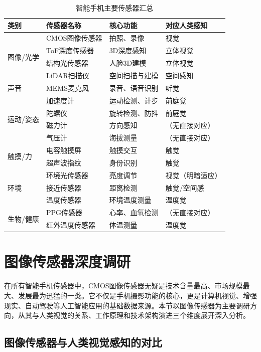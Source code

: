 \documentclass[12pt, a4paper]{ctexart}
\begin{document}
\begin{table}[H]
\centering
\caption{智能手机主要传感器汇总}
\label{tab:sensor_overview}
\small
\begin{tabular}{llll}
\toprule
\textbf{类别} & \textbf{传感器名称} & \textbf{核心功能} & \textbf{对应人类感知} \\
\midrule
\multirow{4}{*}{图像/光学} & CMOS图像传感器 & 拍照、录像 & 视觉 \\
 & ToF深度传感器 & 3D深度感知 & 立体视觉 \\
 & 结构光传感器 & 人脸3D建模 & 立体视觉 \\
 & LiDAR扫描仪 & 空间扫描与建模 & 空间感知 \\
\midrule
声音 & MEMS麦克风 & 录音、语音识别 & 听觉 \\
\midrule
\multirow{4}{*}{运动/姿态} & 加速度计 & 运动检测、计步 & 前庭觉 \\
 & 陀螺仪 & 旋转检测、防抖 & 前庭觉 \\
 & 磁力计 & 方向感知 & （无直接对应） \\
 & 气压计 & 海拔测量 & （无直接对应） \\
\midrule
\multirow{2}{*}{触摸/力} & 电容触摸屏 & 触摸交互 & 触觉 \\
 & 超声波指纹 & 身份识别 & 触觉 \\
\midrule
\multirow{3}{*}{环境} & 环境光传感器 & 亮度调节 & 视觉（明暗适应） \\
 & 接近传感器 & 距离检测 & 触觉/空间感 \\
 & 温度传感器 & 环境温度测量 & 温度觉 \\
\midrule
\multirow{2}{*}{生物/健康} & PPG传感器 & 心率、血氧检测 & （无直接对应） \\
 & 红外温度传感器 & 体温测量 & 温度觉 \\
\bottomrule
\end{tabular}
\end{table}


\section{图像传感器深度调研}

在所有智能手机传感器中，CMOS图像传感器无疑是技术含量最高、市场规模最大、发展最为迅猛的一类。它不仅是手机摄影功能的核心，更是计算机视觉、增强现实、自动驾驶等人工智能应用的基础数据来源。本节以图像传感器为主要调研方向，从其与人类视觉的关系、工作原理和技术架构演进三个维度展开深入分析。

\subsection{图像传感器与人类视觉感知的对比}
\end{document}
